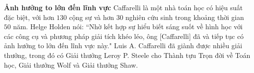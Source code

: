 \begin{multicols}{2}
	\vskip 0.1cm
	\textbf{\color{doisongtoanhoc}Ảnh hưởng to lớn đến lĩnh vực}
	\vskip 0.1cm
	Caffarelli là một nhà toán học có hiệu suất đặc biệt, với hơn $130$ cộng sự và hơn $30$ nghiên cứu sinh trong khoảng thời gian $50$ năm.
	\vskip 0.1cm
	Helge Holden nói: ``Nhờ kết hợp sự hiểu biết sáng suốt về hình học với các công cụ và phương pháp giải tích khéo léo, ông [Caffarelli] đã và tiếp tục có ảnh hưởng to lớn đến lĩnh vực này."
	\vskip 0.1cm
	Luis A. Caffarelli đã giành được nhiều giải thưởng, trong đó có Giải thưởng Leroy P. Steele cho Thành tựu Trọn đời về Toán học, Giải thưởng Wolf và Giải thưởng Shaw.
\end{multicols}
